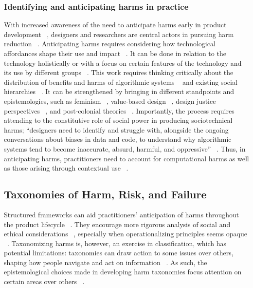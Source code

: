 \subsubsection{Identifying and anticipating harms in practice}
With increased awareness of the need to anticipate harms early in product development ~\cite{Selbst_Boyd_Friedler_Venkatasubramanian_Vertesi_2019}, designers and researchers are central actors in pursuing harm reduction ~\cite{Boyarskaya_2020, Feder_Cooper_Moss_Laufer_Nissenbaum_2022, Green_Viljoen_2020}. Anticipating harms requires considering how technological affordances shape their use and impact ~\cite{Floridi_Strait_2020, Shilton_2015}. It can be done in relation to the technology holistically or with a focus on certain features of the technology and its use by different groups ~\cite{Brey_2012}. This work requires thinking critically about the distribution of benefits and harms of algorithmic systems ~\cite{Birhane_Kalluri_Card_Agnew_Dotan_Bao_2022, Pinch_Bijker_1984} and existing social hierarchies ~\cite{Blodgett_Barocas_Daume_Wallach_2020}. It can be strengthened by bringing in different standpoints and epistemologies, such as feminism ~\cite{DIgnazio_Klein_2021, Noble_2016}, value-based design ~\cite{Ballard_Chappell_Kennedy_2019, Friedman_Hendry_2019, Johnson_2020}, design justice perspectives ~\cite{costanza2020design}, and post-colonial theories ~\cite{Mohamed_Png_Isaac_2020, Taylor_Kukutai_2016}. Importantly, the process requires attending to the constitutive role of social power in producing sociotechnical harms; “designers need to identify and struggle with, alongside the ongoing conversations about biases in data and code, to understand why algorithmic systems tend to become inaccurate, absurd, harmful, and oppressive” ~\cite[p. 2]{Alkhatib2021}. Thus, in anticipating harms, practitioners need to account for computational harms as well as those arising through contextual use ~\cite{Boyarskaya_2020, Passi_Jackson_2018, Weinberg_2022, Saxena2020}.

\subsection{Taxonomies of Harm, Risk, and Failure} 
Structured frameworks can aid practitioners’ anticipation of harms throughout the product lifecycle ~\cite{Madaio_2020, Wong_Boyd_Metcalf_Shilton_2020}. They encourage more rigorous analysis of social and ethical considerations ~\cite{Madaio_2020}, especially when operationalizing principles seems opaque ~\cite{Mittelstadt_2019}. Taxonomizing harms is, however, an exercise in classification, which has potential limitations: taxonomies can draw action to some issues over others, shaping how people navigate and act on information ~\cite{Bowker_Star_2000}. As such, the epistemological choices made in developing harm taxonomies focus attention on certain areas over others ~\cite{Boyarskaya_2020}.

